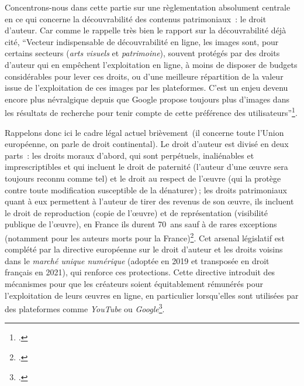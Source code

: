 Concentrons-nous dans cette partie sur une règlementation absolument centrale en ce qui concerne la découvrabilité des contenus patrimoniaux : le droit d’auteur. Car comme le rappelle très bien le rapport sur la découvrabilité déjà cité, \enquote{Vecteur indispensable de découvrabilité en ligne, les images sont, pour certains secteurs (\textit{arts visuels} et \textit{patrimoine}), souvent protégés par des droits d’auteur qui en empêchent l’exploitation en ligne, à moins de disposer de budgets considérables pour lever ces droits, ou d’une meilleure répartition de la valeur issue de l’exploitation de ces images par les plateformes. C’est un enjeu devenu encore plus névralgique depuis que Google propose toujours plus d’images dans les résultats de recherche pour tenir compte de cette préférence des utilisateurs}\footcite[p. 32]{ministeresdelaculturefranceetquebec2020}.

Rappelons donc ici le cadre légal actuel brièvement (il concerne toute l’Union européenne, on parle de droit continental). Le droit d’auteur est divisé en deux parts : les droits moraux d’abord, qui sont perpétuels, inaliénables et imprescriptibles et qui incluent le droit de paternité (l’auteur d’une œuvre sera toujours reconnu comme tel) et le droit au respect de l’œuvre (qui la protège contre toute modification susceptible de la dénaturer) ; les droits patrimoniaux quant à eux permettent à l’auteur de tirer des revenus de son œuvre, ils incluent le droit de reproduction (copie de l’œuvre) et de représentation (visibilité publique de l’œuvre), en France ils durent 70 ans sauf à de rares exceptions (notamment pour les auteurs morts pour la France)\footcite{zotero-323}. Cet arsenal législatif est complété par la directive européenne sur le droit d’auteur et les droits voisins dans le \textit{marché unique numérique} (adoptée en 2019 et transposée en droit français en 2021), qui renforce ces protections. Cette directive introduit des mécanismes pour que les créateurs soient équitablement rémunérés pour l’exploitation de leurs œuvres en ligne, en particulier lorsqu’elles sont utilisées par des plateformes comme \textit{YouTube} ou \textit{Google}\footcite{noauthor_directive_2019}. 

